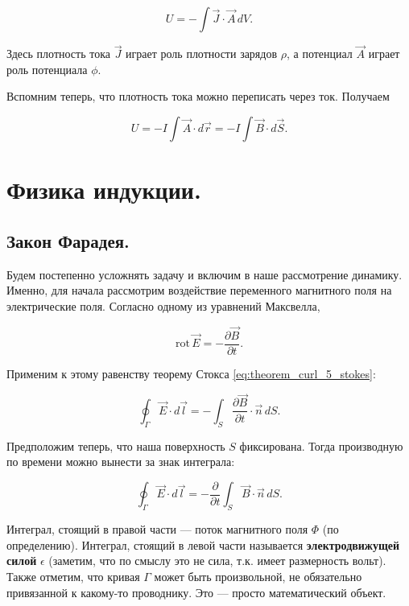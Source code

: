 \documentclass[11pt,a4paper]{article}
\numberwithin{equation}{section}
\newcommand{\pt}{\partial}
\newcommand{\rot}{\mathrm{rot}\,}
\newcommand{\eps}{\epsilon}
\begin{document}
\begin{equation}
  \label{eq:magnet_energy_1}
  U = - \int \vec{J} \cdot \vec{A} \, dV.
\end{equation}

Здесь плотность тока $\vec{J}$ играет роль плотности зарядов $\rho$, а
потенциал $\vec{A}$ играет роль потенциала $\phi$. 

Вспомним теперь, что плотность тока можно переписать через
ток. Получаем

\begin{equation}
  \label{eq:magnet_energy_2}
  U = - I \int \vec{A} \cdot d \vec{r} = - I \int \vec{B} \cdot d \vec{S}.
\end{equation}

\section{Физика индукции.}
\label{sec:induction}

\subsection{Закон Фарадея.}
\label{sec:faradays_law}

Будем постепенно усложнять задачу и включим в наше рассмотрение
динамику. Именно, для начала рассмотрим воздействие переменного
магнитного поля на электрические поля. Согласно одному из уравнений
Максвелла, 

\begin{equation}
  \label{eq:der_faraday_1}
  \rot \vec{E} = -\frac{\pt \vec{B}}{\pt t}.
\end{equation}

Применим к этому равенству теорему Стокса
\eqref{eq:theorem_curl_5_stokes}:

\begin{equation}
  \label{eq:der_faraday_2}
  \oint_{\Gamma} \vec{E} \cdot d \vec{l} = - \int_S \frac{\pt
    \vec{B}}{\pt t} \cdot \vec{n}\, dS.
\end{equation}

Предположим теперь, что наша поверхность $S$ фиксирована. Тогда
производную по времени можно вынести за знак интеграла:

\begin{equation}
  \label{eq:der_faraday_3}
  \oint_{\Gamma} \vec{E} \cdot d \vec{l} = - \frac{\pt}{\pt t} \int_S
  \vec{B} \cdot \vec{n}\, dS.
\end{equation}

Интеграл, стоящий в правой части --- поток магнитного поля $\Phi$ (по
определению). Интеграл, стоящий в левой части называется
\textbf{электродвижущей силой} $\eps$ (заметим, что по смыслу это не сила,
т.к. имеет размерность вольт). Также отметим, что кривая $\Gamma$
может быть произвольной, не обязательно привязанной к какому-то
проводнику. Это --- просто математический объект. 
\end{document}
